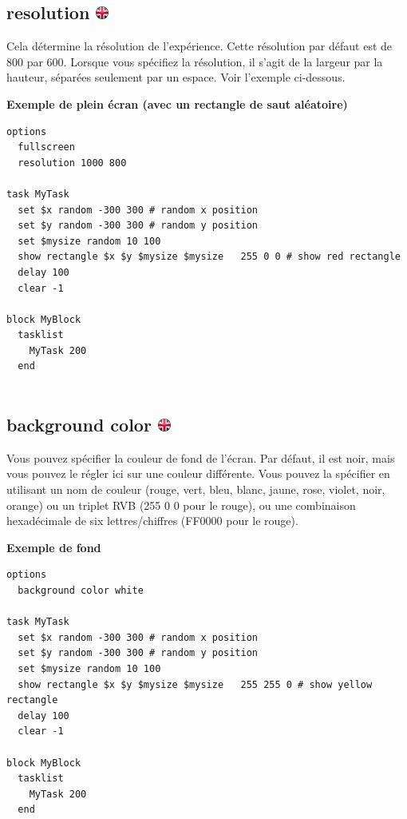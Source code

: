 \documentclass[
]{book}
\begin{document}
\hypertarget{resolution}{%
\subsection[resolution ]{\texorpdfstring{resolution \href{https://www.psytoolkit.org/doc3.2.0/syntax.html\#options-resolution}{\protect\includegraphics{img/ukflag.png}}}{resolution }}\label{resolution}}

Cela détermine la résolution de l'expérience. Cette résolution par défaut est de 800 par 600. Lorsque vous spécifiez la résolution, il s'agit de la largeur par la hauteur, séparées seulement par un espace. Voir l'exemple ci-dessous.

\textbf{Exemple de plein écran (avec un rectangle de saut aléatoire)}

\begin{verbatim}
options
  fullscreen
  resolution 1000 800

task MyTask
  set $x random -300 300 # random x position
  set $y random -300 300 # random y position
  set $mysize random 10 100
  show rectangle $x $y $mysize $mysize   255 0 0 # show red rectangle
  delay 100
  clear -1

block MyBlock
  tasklist
    MyTask 200
  end
  
\end{verbatim}

\hypertarget{background-color}{%
\subsection[background color ]{\texorpdfstring{background color \href{https://www.psytoolkit.org/doc3.2.0/syntax.html\#options-background}{\protect\includegraphics{img/ukflag.png}}}{background color }}\label{background-color}}

Vous pouvez spécifier la couleur de fond de l'écran. Par défaut, il est noir, mais vous pouvez le régler ici sur une couleur différente. Vous pouvez la spécifier en utilisant un nom de couleur (rouge, vert, bleu, blanc, jaune, rose, violet, noir, orange) ou un triplet RVB (255 0 0 pour le rouge), ou une combinaison hexadécimale de six lettres/chiffres (FF0000 pour le rouge).

\textbf{Exemple de fond}

\begin{verbatim}
options
  background color white

task MyTask
  set $x random -300 300 # random x position
  set $y random -300 300 # random y position
  set $mysize random 10 100
  show rectangle $x $y $mysize $mysize   255 255 0 # show yellow rectangle
  delay 100
  clear -1

block MyBlock
  tasklist
    MyTask 200
  end
  
\end{verbatim}
\end{document}

